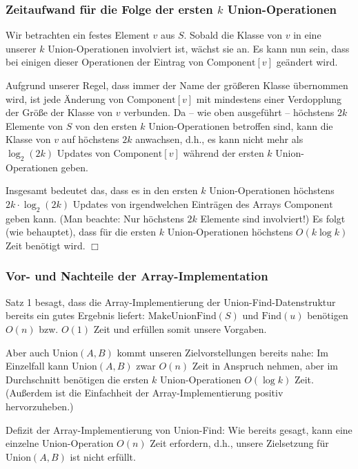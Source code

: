 \documentclass[smaller,xcolor=dvipsnames]{beamer}
\newcommand{\opfind}{\text{Find}}
\newcommand{\opunion}{\text{Union}}
\newcommand{\opmakeunionfind}{\text{MakeUnionFind}}
\newcommand{\component}{\text{Component}}
\begin{document}
\begin{frame}
\frametitle{Zeitaufwand für die Folge der ersten $k$ Union-Operationen}
 Wir betrachten ein festes Element $v$ aus $S$. Sobald die Klasse von $v$ in eine unserer $k$ $\opunion$-Operationen involviert ist, wächst sie an. Es kann nun sein, dass bei einigen dieser Operationen der Eintrag von $\component[v]$ geändert wird. \\ \medskip
 
 Aufgrund unserer Regel, dass immer der Name der größeren Klasse übernommen wird, ist jede Änderung von $\component[v]$ mit mindestens einer Verdopplung der Größe der Klasse von $v$ verbunden. Da -- wie oben ausgeführt -- höchstens $2k$ Elemente von $S$ von den ersten $k$ $\opunion$-Operationen betroffen sind, kann die Klasse von $v$ auf höchstens $2k$ anwachsen, d.h., \alert{es kann nicht mehr als $\log_2{(2k)}$ Updates von $\component[v]$ während der ersten $k$ Union-Operationen geben}. \\ \medskip
 
 Insgesamt bedeutet das, dass es in den ersten $k$ $\opunion$-Operationen höchstens $2k \cdot \log_2{(2k)}$ Updates von irgendwelchen Einträgen des Arrays $\component$ geben kann. (Man beachte: Nur höchstens $2k$ Elemente sind involviert!) Es folgt (wie behauptet), dass für die ersten $k$ $\opunion$-Operationen höchstens $O(k\log{k})$ Zeit benötigt wird. \qquad $\Box$
\end{frame}

\begin{frame}
\frametitle{Vor- und Nachteile der Array-Implementation}
\alert{Satz 1 besagt, dass die Array-Implementierung der Union-Find-Datenstruktur bereits ein gutes Ergebnis liefert:} $\opmakeunionfind{(S)}$ und $\opfind{(u)}$ benötigen $O(n)$ bzw. $O(1)$ Zeit und erfüllen somit unsere Vorgaben. \\ \medskip

Aber auch $\opunion{(A,B)}$ kommt unseren Zielvorstellungen bereits nahe: Im Einzelfall kann $\opunion{(A,B)}$ zwar $O(n)$ Zeit in Anspruch nehmen, aber \alert{im Durchschnitt} benötigen die ersten $k$ $\opunion$-Operationen $O(\log{k})$ Zeit. (Außerdem ist die Einfachheit der Array-Implementierung positiv hervorzuheben.) \\ \medskip

\alert{Defizit der Array-Implementierung von Union-Find}: Wie bereits gesagt, kann eine einzelne $\opunion$-Operation $O(n)$ Zeit erfordern, d.h., unsere Zielsetzung für $\opunion{(A,B)}$ ist nicht erfüllt.
\end{frame}
\end{document}
